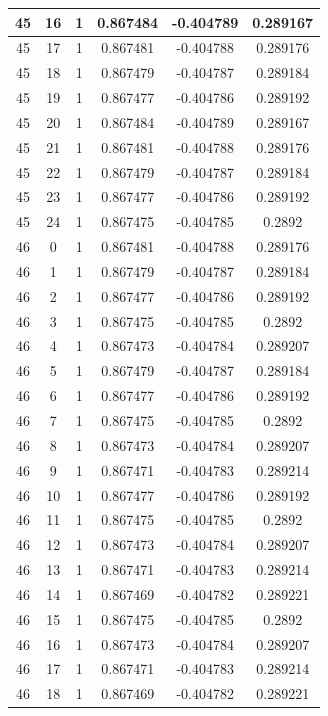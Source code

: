 \documentclass[12pt,a4paper]{article}
\numberwithin{equation}{section}
\numberwithin{figure}{section}
\numberwithin{table}{section}
\begin{document}
\begin{longtable}{|c|c|c|c|c|c|}
45 & 16 & 1 & 0.867484 & -0.404789 & 0.289167 \\ \hline
45 & 17 & 1 & 0.867481 & -0.404788 & 0.289176 \\ \hline
45 & 18 & 1 & 0.867479 & -0.404787 & 0.289184 \\ \hline
45 & 19 & 1 & 0.867477 & -0.404786 & 0.289192 \\ \hline
45 & 20 & 1 & 0.867484 & -0.404789 & 0.289167 \\ \hline
45 & 21 & 1 & 0.867481 & -0.404788 & 0.289176 \\ \hline
45 & 22 & 1 & 0.867479 & -0.404787 & 0.289184 \\ \hline
45 & 23 & 1 & 0.867477 & -0.404786 & 0.289192 \\ \hline
45 & 24 & 1 & 0.867475 & -0.404785 & 0.2892 \\ \hline
46 & 0 & 1 & 0.867481 & -0.404788 & 0.289176 \\ \hline
46 & 1 & 1 & 0.867479 & -0.404787 & 0.289184 \\ \hline
46 & 2 & 1 & 0.867477 & -0.404786 & 0.289192 \\ \hline
46 & 3 & 1 & 0.867475 & -0.404785 & 0.2892 \\ \hline
46 & 4 & 1 & 0.867473 & -0.404784 & 0.289207 \\ \hline
46 & 5 & 1 & 0.867479 & -0.404787 & 0.289184 \\ \hline
46 & 6 & 1 & 0.867477 & -0.404786 & 0.289192 \\ \hline
46 & 7 & 1 & 0.867475 & -0.404785 & 0.2892 \\ \hline
46 & 8 & 1 & 0.867473 & -0.404784 & 0.289207 \\ \hline
46 & 9 & 1 & 0.867471 & -0.404783 & 0.289214 \\ \hline
46 & 10 & 1 & 0.867477 & -0.404786 & 0.289192 \\ \hline
46 & 11 & 1 & 0.867475 & -0.404785 & 0.2892 \\ \hline
46 & 12 & 1 & 0.867473 & -0.404784 & 0.289207 \\ \hline
46 & 13 & 1 & 0.867471 & -0.404783 & 0.289214 \\ \hline
46 & 14 & 1 & 0.867469 & -0.404782 & 0.289221 \\ \hline
46 & 15 & 1 & 0.867475 & -0.404785 & 0.2892 \\ \hline
46 & 16 & 1 & 0.867473 & -0.404784 & 0.289207 \\ \hline
46 & 17 & 1 & 0.867471 & -0.404783 & 0.289214 \\ \hline
46 & 18 & 1 & 0.867469 & -0.404782 & 0.289221 \\ \hline

\end{longtable}
\end{document}
